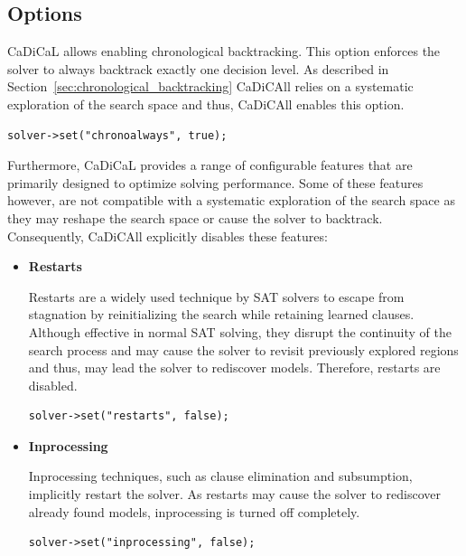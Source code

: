 \documentclass[12pt,a4paper]{article}
\begin{document}
\subsection{Options}

CaDiCaL allows enabling chronological backtracking. This option enforces the solver to always backtrack exactly one decision level. As described in Section~\ref{sec:chronological_backtracking} CaDiCAll relies on a systematic exploration of the search space and thus, CaDiCAll enables this option.

\begin{verbatim}
solver->set("chronoalways", true);
\end{verbatim}

Furthermore, CaDiCaL provides a range of configurable features that are primarily designed to optimize solving performance. Some of these features however, are not compatible with a systematic exploration of the search space as they may reshape the search space or cause the solver to backtrack. Consequently, CaDiCAll explicitly disables these features:

\begin{itemize}

\item \textbf{Restarts}

Restarts are a widely used technique by SAT solvers to escape from stagnation by reinitializing the search while retaining learned clauses. Although effective in normal SAT solving, they disrupt the continuity of the search process and may cause the solver to revisit previously explored regions and thus, may lead the solver to rediscover models. Therefore, restarts are disabled.

\begin{verbatim}
solver->set("restarts", false);
\end{verbatim}

\newpage

\item \textbf{Inprocessing}

Inprocessing techniques, such as clause elimination and subsumption, implicitly restart the solver. As restarts may cause the solver to rediscover already found models, inprocessing is turned off completely.

\begin{verbatim}
solver->set("inprocessing", false);
\end{verbatim}

% 
% 
% 

\end{itemize}
\end{document}
